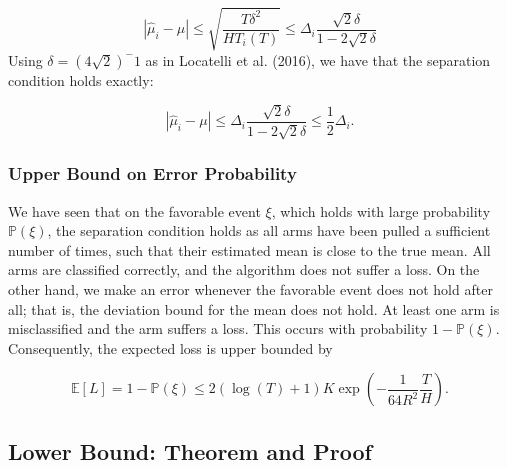 \documentclass[12pt,]{article}
\begin{document}
\[
|\hat{\mu}_i - \mu | \leq \sqrt{\frac{T\delta^2}{H T_i(T)}} \leq \Delta_i \frac{\sqrt{2}\delta}{1-2\sqrt{2}\delta}
\] Using \(\delta = (4\sqrt{2})^-1\) as in Locatelli et al. (2016), we
have that the separation condition holds exactly:

\[
|\hat{\mu}_i - \mu | \leq \Delta_i \frac{\sqrt{2}\delta}{1-2\sqrt{2}\delta} \leq \frac{1}{2}\Delta_i.
\]

\subsubsection{Upper Bound on Error
Probability}\label{upper-bound-on-error-probability}

We have seen that on the favorable event \(\xi\), which holds with large
probability \(\mathbb{P}(\xi)\), the separation condition holds as all
arms have been pulled a sufficient number of times, such that their
estimated mean is close to the true mean. All arms are classified
correctly, and the algorithm does not suffer a loss. On the other hand,
we make an error whenever the favorable event does not hold after all;
that is, the deviation bound for the mean does not hold. At least one
arm is misclassified and the arm suffers a loss. This occurs with
probability \(1-\mathbb{P}(\xi)\). Consequently, the expected loss is
upper bounded by

\[
\mathbb{E}[L] = 1 - \mathbb{P}(\xi) \leq 2(\log(T)+1)K \exp(-\frac{1}{64R^2}\frac{T}{H}).
\]

\newpage

\subsection{\texorpdfstring{Lower Bound: Theorem and Proof
\label{sec:LowerBoundLocatelli}}{Lower Bound: Theorem and Proof }}\label{lower-bound-theorem-and-proof}
\end{document}
